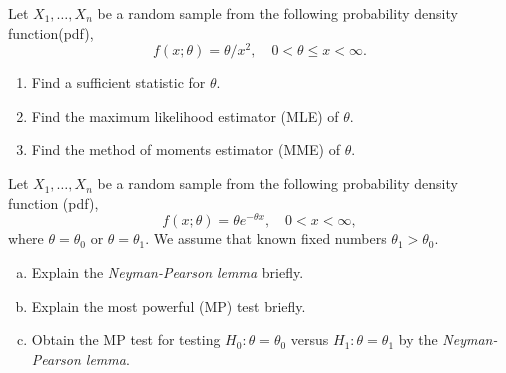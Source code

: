 \documentclass[answers]{exam}
\begin{document}
\begin{questions}
\begin{solution}
    \end{solution}
    \question
    Let $X_{1},\ldots,X_{n}$ be a random sample from the following probability density function(pdf),
    $$
      f\left(x;\theta\right)=\theta/x^{2},\quad 0<\theta\leq x<\infty.
    $$
    \begin{enumerate}
      \item Find a sufficient statistic for $\theta$.
      \item Find the maximum likelihood estimator (MLE) of $\theta$.
      \item Find the method of moments estimator (MME) of $\theta$.
    \end{enumerate}
    \begin{solution}

    \end{solution}
    \question
    Let $X_{1},\ldots, X_{n}$ be a random sample from the following probability density function (pdf),
    $$
      f\left(x;\theta\right)=\theta e^{-\theta x}, \quad 0<x<\infty,
    $$
    where $\theta=\theta_{0}$ or $\theta=\theta_{1}$. We assume that known fixed numbers $\theta_{1}>\theta_{0}$.
    \begin{enumerate}[(a)]
      \item Explain the \emph{Neyman-Pearson lemma} briefly.
      \item Explain the most powerful (MP) test briefly.
      \item Obtain the MP test for testing $H_{0}:\theta=\theta_{0}$ versus $H_{1}:\theta=\theta_{1}$ by the \emph{Neyman-Pearson lemma}.
    \end{enumerate}
    \begin{solution}

    \end{solution}
\end{questions}
\end{document}
